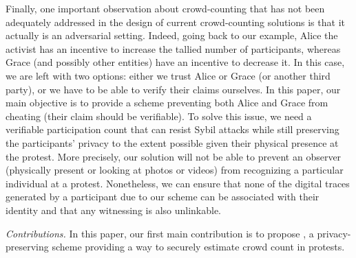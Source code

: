 Finally, one important observation about crowd-counting that has not been adequately addressed in the design of current crowd-counting solutions is that it actually is an adversarial setting. 
Indeed, going back to our example, Alice the activist has an incentive to increase the tallied number of participants, whereas Grace (and possibly other entities) have an incentive to decrease it.
In this case, we are left with two options: either we trust Alice or Grace (or another third party), or we have to be able to verify their claims ourselves.
In this paper, our main objective is to provide a scheme preventing both Alice and Grace from cheating (\ie their claim should be verifiable).
To solve this issue, we need a verifiable participation count that can resist Sybil attacks while still preserving the participants' privacy to the extent possible given their physical presence at the protest. 
More precisely, our solution will not be able to prevent an observer (physically present or looking at photos or videos) from recognizing a particular individual at a protest. 
Nonetheless, we can ensure that none of the digital traces generated by a participant due to our scheme can be associated with 
their identity and that any witnessing is also unlinkable.

\emph{Contributions.} In this paper, our first main contribution is to propose \PRIVO, a privacy-preserving scheme providing a way to securely estimate crowd count in protests.


